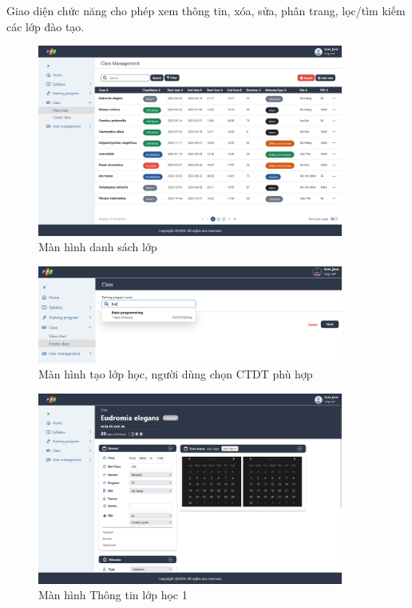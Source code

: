 \documentclass[report.tex]{subfiles}
\begin{document}
Giao diện chức năng cho phép xem thông tin, xóa, sửa, phân trang, lọc/tìm kiếm các lớp đào tạo.

\begin{figure}[!htb]
{\centering
\includegraphics[width=380px]{../meta/ui.class-list.png}
\caption{Màn hình danh sách lớp}
\par
}
\end{figure}
\FloatBarrier

\begin{figure}[!htb]
{\centering
\includegraphics[width=380px]{../meta/ui.class-create1.png}
\caption[Màn hình tạo lớp học]{Màn hình tạo lớp học, người dùng chọn CTDT phù hợp}
\par
}
\end{figure}
\FloatBarrier

\begin{figure}[!htb]
{\centering
\includegraphics[width=380px]{../meta/ui.class-detail.png}
\caption{Màn hình Thông tin lớp học 1}
\par
}
\end{figure}
\FloatBarrier
\end{document}
